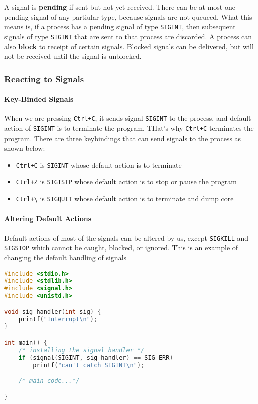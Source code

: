 \documentclass{article}
\newcommand{\bold}[1]{\textbf{#1}}
\renewcommand{\b}{\item[$\circ$]}
\newcommand{\newlist}{\begin{itemize}}
\renewcommand{\endlist}{\end{itemize}}
\newcommand{\code}[1]{\texttt{#1}}
\begin{document}
A signal is \bold{pending} if sent but not yet received. There can be at most one pending signal of any partiular type, because signals are not queueed. What this means is, if a process has a pending signal of type \code{SIGINT}, then subsequent signals of type \code{SIGINT} that are sent to that process are discarded. A process can also \bold{block} to receipt of certain signals. Blocked signals can be delivered, but will not be received until the signal is unblocked. 

\subsubsection{Reacting to Signals}

\paragraph{Key-Binded Signals}

When we are pressing \code{Ctrl+C}, it sends signal \code{SIGINT} to the process, and default action of \code{SIGINT} is to terminate the program. THat's why \code{Ctrl+C} terminates the program. There are three keybindings that can send signals to the process as shown below:

\newlist 
\b \code{Ctrl+C} is \code{SIGINT} whose default action is to terminate
\b \code{Ctrl+Z} is \code{SIGTSTP} whose default action is to stop or pause the program
\b \code{Ctrl+\textbackslash} is \code{SIGQUIT} whose default action is to terminate and dump core
\endlist 

\paragraph{Altering Default Actions}

Default actions of most of the signals can be altered by us, except \code{SIGKILL} and \code{SIGSTOP} which cannot be caught, blocked, or ignored. This is an example of changing the default handling of signals

\begin{lstlisting}[language=c]
#include <stdio.h>
#include <stdlib.h>
#include <signal.h>
#include <unistd.h>

void sig_handler(int sig) {
    printf("Interrupt\n");
}

int main() {
    /* installing the signal handler */
    if (signal(SIGINT, sig_handler) == SIG_ERR)
        printf("can't catch SIGINT\n");

    /* main code...*/

}
\end{lstlisting}
\end{document}
